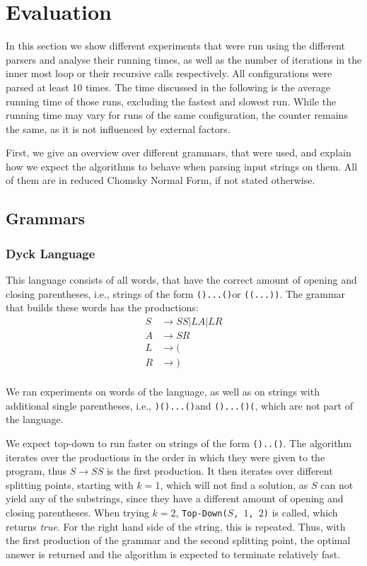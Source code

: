 \section{Evaluation}
\label{sec:Evaluation}
In this section we show different experiments that were run using the different parsers and analyse their running times, as well as the number of iterations in the inner most loop or their recursive calls respectively.
All configurations were parsed at least 10 times.
The time discussed in the following is the average running time of those runs, excluding the fastest and slowest run.
While the running time may vary for runs of the same configuration, the counter remains the same, as it is not influenced by external factors.

First, we give an overview over different grammars, that were used, and explain how we expect the algorithms to behave when parsing input strings on them.
All of them are in reduced Chomsky Normal Form, if not stated otherwise.

\subsection{Grammars}
\subsubsection{Dyck Language}
This language consists of all words, that have the correct amount of opening and closing parentheses, i.e., strings of the form \texttt{()...()}or \texttt{((...))}.
The grammar that builds these words has the productions:
\begin{align*}
    S&\rightarrow SS|LA|LR\\
    A&\rightarrow SR\\
    L&\rightarrow (\\
    R&\rightarrow )\\
\end{align*}

We ran experiments on words of the language, as well as on strings with additional single parentheses, i.e., \texttt{)()...()}and \texttt{()...()(}, which are not part of the language.

We expect top-down to run faster on strings of the form \texttt{()..()}.
The algorithm iterates over the productions in the order in which they were given to the program, thus $S\rightarrow SS$ is the first production.
It then iterates over different splitting points, starting with $k=1$, which will not find a solution, as $S$ can not yield any of the substrings, since they have a different amount of opening and closing parentheses.
When trying $k=2$, \texttt{Top-Down($S$, $1$, $2$)} is called, which returns \textit{true}.
For the right hand side of the string, this is repeated.
Thus, with the first production of the grammar and the second splitting point, the optimal answer is returned and the algorithm is expected to terminate relatively fast.

